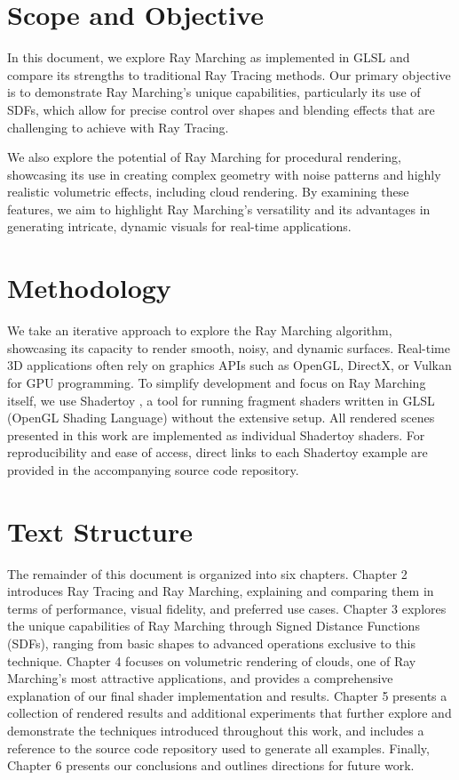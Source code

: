 
\section{Scope and Objective}

In this document, we explore Ray Marching as implemented in GLSL and compare its strengths to traditional Ray Tracing methods. Our primary objective is to demonstrate Ray Marching's unique capabilities, particularly its use of SDFs, which allow for precise control over shapes and blending effects that are challenging to achieve with Ray Tracing.


We also explore the potential of Ray Marching for procedural rendering, showcasing its use in creating complex geometry with noise patterns and highly realistic volumetric effects, including cloud rendering. By examining these features, we aim to highlight Ray Marching’s versatility and its advantages in generating intricate, dynamic visuals for real-time applications.

\section{Methodology}

We take an iterative approach to explore the Ray Marching algorithm, showcasing its capacity to render smooth, noisy, and dynamic surfaces. Real-time 3D applications often rely on graphics APIs such as OpenGL, DirectX, or Vulkan for GPU programming. To simplify development and focus on Ray Marching itself, we use Shadertoy , a tool for running fragment shaders written in GLSL (OpenGL Shading Language) without the extensive setup. All rendered scenes presented in this work are implemented as individual Shadertoy shaders. For reproducibility and ease of access, direct links to each Shadertoy example are provided in the accompanying source code repository.

\section{Text Structure}

The remainder of this document is organized into six chapters.  
Chapter 2 introduces Ray Tracing and Ray Marching, explaining and comparing them in terms of performance, visual fidelity, and preferred use cases.  
Chapter 3 explores the unique capabilities of Ray Marching through Signed Distance Functions (SDFs), ranging from basic shapes to advanced operations exclusive to this technique.
Chapter 4 focuses on volumetric rendering of clouds, one of Ray Marching’s most attractive applications, and provides a comprehensive explanation of our final shader implementation and results.  
Chapter 5 presents a collection of rendered results and additional experiments that further explore and demonstrate the techniques introduced throughout this work, and includes a reference to the source code repository used to generate all examples.
Finally, Chapter 6 presents our conclusions and outlines directions for future work.